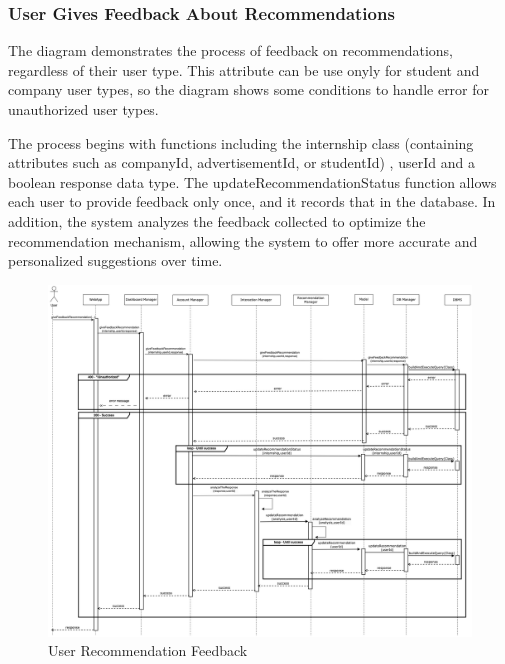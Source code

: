 \documentclass[a4paper,12pt]{article}
\begin{document}
\subsubsection*{ User Gives Feedback About Recommendations}  

The diagram demonstrates the process of feedback on recommendations, regardless of their user type. This attribute can be use onyly for student and company user types, so the diagram shows some conditions to handle error for unauthorized user types.

The process begins with functions including the internship class (containing attributes such as companyId, advertisementId, or studentId) , userId and a boolean response data type. The updateRecommendationStatus function allows each user to provide feedback only once, and it records that in the database. In addition, the system analyzes the feedback collected to optimize the recommendation mechanism, allowing the system to offer more accurate and personalized suggestions over time.
    \begin{figure}[H]
    \centering
    \includegraphics[scale = 0.25]{DD_figures/RuntimeView/userGiveFeedbackRecomm.drawio.png}
    \caption{User Recommendation Feedback}
\end{figure}
\end{document}
